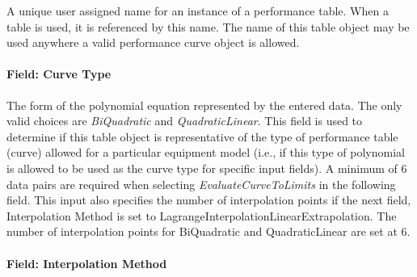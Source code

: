 A unique user assigned name for an instance of a performance table. When a table is used, it is referenced by this name. The name of this table object may be used anywhere a valid performance curve object is allowed.

\paragraph{Field: Curve Type}\label{field-curve-type-1}

The form of the polynomial equation represented by the entered data. The only valid choices are \emph{BiQuadratic} and \emph{QuadraticLinear}. This field is used to determine if this table object is representative of the type of performance table (curve) allowed for a particular equipment model (i.e., if this type of polynomial is allowed to be used as the curve type for specific input fields). A minimum of 6 data pairs are required when selecting \emph{EvaluateCurveToLimits} in the following field. This input also specifies the number of interpolation points if the next field, Interpolation Method is set to LagrangeInterpolationLinearExtrapolation. The number of interpolation points for BiQuadratic and QuadraticLinear are set at 6.

\paragraph{Field: Interpolation Method}\label{field-interpolation-method-1}

